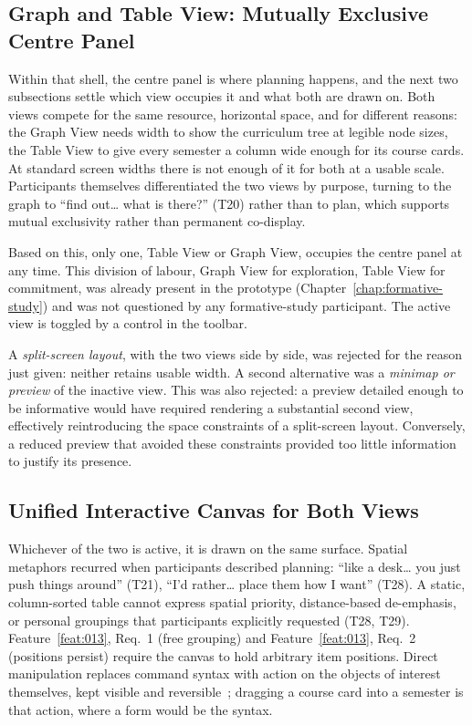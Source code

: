 \subsection{Graph and Table View: Mutually Exclusive Centre Panel}
\label{sec:mutual-exclusion}
Within that shell, the centre panel is where planning happens, and the next two subsections settle which view occupies it and what both are drawn on. Both views compete for the same resource, horizontal space, and for different reasons: the Graph View needs width to show the curriculum tree at legible node sizes, the Table View to give every semester a column wide enough for its course cards. At standard screen widths there is not enough of it for both at a usable scale. Participants themselves differentiated the two views by purpose, turning to the graph to \enquote{find out… what is there?} (T20) rather than to plan, which supports mutual exclusivity rather than permanent co-display.

Based on this, only one, Table View or Graph View, occupies the centre panel at any time. This division of labour, Graph View for exploration, Table View for commitment, was already present in the prototype (Chapter~\ref{chap:formative-study}) and was not questioned by any formative-study participant. The active view is toggled by a control in the toolbar.

A \emph{split-screen layout}, with the two views side by side, was rejected for the reason just given: neither retains usable width. A second alternative was a \emph{minimap or preview} of the inactive view. This was also rejected: a preview detailed enough to be informative would have required rendering a substantial second view, effectively reintroducing the space constraints of a split-screen layout. Conversely, a reduced preview that avoided these constraints provided too little information to justify its presence.

\subsection{Unified Interactive Canvas for Both Views}
\label{sec:canvas}
Whichever of the two is active, it is drawn on the same surface. Spatial metaphors recurred when participants described planning: \enquote{like a desk… you just push things around} (T21), \enquote{I'd rather… place them how I want} (T28). A static, column-sorted table cannot express spatial priority, distance-based de-emphasis, or personal groupings that participants explicitly requested (T28, T29). Feature~\ref{feat:013}, Req.~1 (free grouping) and Feature~\ref{feat:013}, Req.~2 (positions persist) require the canvas to hold arbitrary item positions. Direct manipulation replaces command syntax with action on the objects of interest themselves, kept visible and reversible~\cite{shneiderman1983}; dragging a course card into a semester is that action, where a form would be the syntax.

